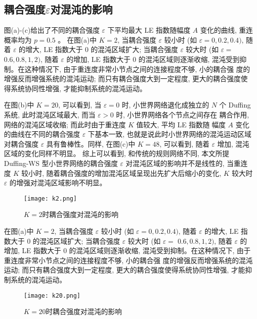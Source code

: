 \subsection*{耦合强度$\varepsilon$对混沌的影响}
图(a)-(c)给出了不同的耦合强度 $\varepsilon$ 下平均最大 LE 指数随幅度 $A$ 变化的曲线, 重连概率均为 $p=0.5$ 。
在图(a)中 $K=2$, 当耦合强度 $\varepsilon$ 较小时 (如 $\varepsilon=0,0.2,0.4)$, 随着 $\varepsilon$ 的增大,
LE 指数大于 0 的混沌区域扩大; 当耦合强度 $\varepsilon$ 较大时 (如 $\varepsilon=$ $0.6,0.8,1,2)$, 
随着 $\varepsilon$ 的增加, LE 指数大于 0 的混沌区域则逐渐收缩, 混沌受到抑制。在这种情况下, 
由于重连度非常小节点之间的连接程度不够, 小的耦合强 度的增强反而增强系统的混沌运动; 而只有耦合强度大到一定程度, 
更大的耦合强度使得系统协同性增强, 才能抑制系统的混沌运动。\par
在图(b)中 $K=20$, 可以看到, 当 $\varepsilon=0$ 时, 小世界网络退化成独立的 $N$ 个 Duffing系统, 此时混沌区域最大, 
而当 $\varepsilon>0$ 时, 小世界网络各个节点之间存在 耦合作用, 网络的混沌区域收缩; 而此时由于重连度 $K$ 值较大, 平均 LE 指数随
幅度 $A$ 变化的曲线在不同的耦合强度 $\varepsilon$ 下基本一致, 也就是说此时小世界网络的混沌运动区域对耦合强度 
$\varepsilon$ 具有鲁棒性。同样, 在图(c)中 $K=48$, 可以看到, 随着 $\varepsilon$ 增加, 混沌区域的变化同样不明显。
综上可以看到, 和传统的规则网络不同, 本文所提 Duffing-WS 型小世界网络的耦合强度 $\varepsilon$ 
对混沌区域的影响并不是线性的, 当重连度 $K$ 较小时, 随着耦合强度的增加混沌区域呈现出先扩大后缩小的变化, 
$K$ 较大时 $\varepsilon$ 的增强对混沌区域影响不明显。\par
\begin{figure}[!htbp]
    \centering
    \texttt{[image: k2.png]}
    \caption{$K=2$时耦合强度对混沌的影响}
\end{figure}
在图(a)中 $K=2$, 当耦合强度 $\varepsilon$ 较小时 (如 $\varepsilon=0,0.2,0.4)$, 随着 $\varepsilon$ 的增大,
LE 指数大于 0 的混沌区域扩大; 当耦合强度 $\varepsilon$ 较大时 (如 $\varepsilon=$ $0.6,0.8,1,2)$,
随着 $\varepsilon$ 的增加, LE 指数大于 0 的混沌区域则逐渐收缩, 混沌受到抑制。在这种情况下,
由于重连度非常小节点之间的连接程度不够, 小的耦合强 度的增强反而增强系统的混沌运动; 而只有耦合强度大到一定程度,
更大的耦合强度使得系统协同性增强, 才能抑制系统的混沌运动。\par
\begin{figure}[!htbp]
    \centering
    \texttt{[image: k20.png]}
    \caption{$K=20$时耦合强度对混沌的影响}
\end{figure}

